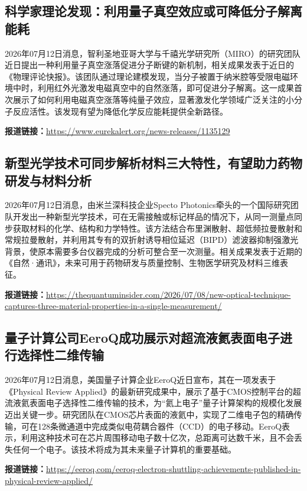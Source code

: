 \documentclass[12pt,a4paper]{ctexart}
\begin{document}
\subsection{ 科学家理论发现：利用量子真空效应或可降低分子解离能耗 }

2026年07月12日消息，智利圣地亚哥大学与千禧光学研究所（MIRO）的研究团队近日提出一种利用量子真空涨落促进分子断键的新机制，相关成果发表于近日的《物理评论快报》。该团队通过理论建模发现，当分子被置于纳米腔等受限电磁环境中时，利用红外光激发电磁真空中的自然涨落，即可促进分子解离。这一成果首次展示了如何利用电磁真空涨落等纯量子效应，显著激发化学领域广泛关注的小分子反应活性。该发现有望为降低化学反应能耗提供全新路径。

\noindent\textbf{报道链接：}\url{https://www.eurekalert.org/news-releases/1135129}

\subsection{ 新型光学技术可同步解析材料三大特性，有望助力药物研发与材料分析 }

2026年07月12日消息，由米兰深科技企业Specto Photonics牵头的一个国际研究团队开发出一种新型光学技术，可在无需接触或标记样品的情况下，从同一测量点同步获取材料的化学、结构和力学特性。该方法结合布里渊散射、超低频拉曼散射和常规拉曼散射，并利用其专有的双折射诱导相位延迟（BIPD）滤波器抑制强激光背景，使原本需要多台仪器完成的分析可整合至一次测量。相关成果发表于近期的《自然·通讯》，未来可用于药物研发与质量控制、生物医学研究及材料三维表征。

\noindent\textbf{报道链接：}\url{https://thequantuminsider.com/2026/07/08/new-optical-technique-captures-three-material-properties-in-a-single-measurement/}

\subsection{ 量子计算公司EeroQ成功展示对超流液氦表面电子进行选择性二维传输 }

2026年07月12日消息，美国量子计算企业EeroQ近日宣布，其在一项发表于《Physical Review Applied》的最新研究成果中，展示了基于CMOS控制平台的超流液氦表面电子选择性二维传输的技术，为“氦上电子”量子计算架构的规模化发展迈出关键一步。研究团队在CMOS芯片表面的液氦中，实现了二维电子包的精确传输，可在128条微通道中完成类似电荷耦合器件（CCD）的电子移动。EeroQ表示，利用这种技术可在芯片周围移动电子数十亿次，总距离可达数千米，且不会丢失任何一个电子。该技术将成为其未来量子计算机的重要基础。

\noindent\textbf{报道链接：}\url{https://eeroq.com/eeroq-electron-shuttling-achievements-published-in-physical-review-applied/}
\end{document}
